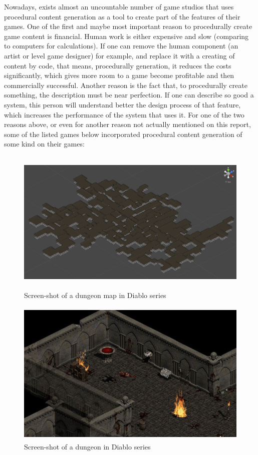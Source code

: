 \documentclass[a4paper,12pt]{book}
\begin{document}
Nowadays, exists almost an uncountable number of game studios that uses procedural content generation as a tool to create part of the features of their games.
One of the first and maybe most important reason to procedurally create game content is financial. Human work is either expensive and slow (comparing to computers for calculations). If one can remove the human component (an artist or level game designer) for example, and replace it with a creating of content by code, that means, procedurally generation, it reduces the costs significantly, which gives more room to a game become profitable and then commercially successful. 
Another reason is the fact that, to procedurally create something, the description must be near perfection.  If one can describe so good a system, this person will understand better the design process of that feature, which increases the performance of the system that uses it.
For one of the two reasons above, or even for another reason not actually mentioned on this report, some of the listed games below incorporated procedural content generation of some kind on their games:

\begin{figure}
\begin{center}
\includegraphics[height=70mm]{diablo_series_1.jpg}
\end{center}
\caption{Screen-shot of a dungeon map in Diablo series}
\label{fig:2.1}
\end{figure}

\begin{figure}
\begin{center}
\includegraphics[height=70mm]{diablo_series_2.jpg}
\end{center}
\caption{Screen-shot of a dungeon in Diablo series}
\label{fig:2.2}
\end{figure}
\end{document}
